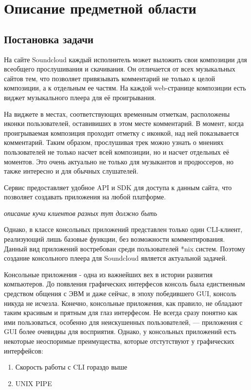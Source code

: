 \section{Описание предметной области}
\subsection{Постановка задачи}

На сайте Soundcloud каждый исполнитель
может выложить свои композиции для всеобщего прослушивания и
скачивания. Он отличается от всех музыкальных сайтов тем, что
позволяет привязывать комментарий не только к целой композиции, а к
отдельным ее частям. На каждой web-странице композиции есть виджет
музыкального плеера для её проигрывания. 

На виджете в  местах, соответствующих временным отметкам,
расположены иконки пользователей, оставивиших в этом месте
комментарий. В момент, когда проигрываемая композиция проходит отметку
с иконкой, над ней показывается комментарий. Таким образом,
прослушивая трек можно узнать о мнениях пользователей не только насчет
всей композиции, но и насчет отдельных её моментов. Это очень
актуально не только для музыкантов и продюссеров, но также интересно и
для обычных слушателей. 

Сервис предоставляет удобное API и SDK для доступа к данным сайта, что
позволяет создавать приложения на любой платформе. 

{\itshape описание кучи клиентов разных тут должно быть}

Однако, в классе консольных приложений представлен только один CLI-клиент, реализующий
лишь базовые функции, без возможности комментирования. Данный
вид приложений востребован среди пользователей *nix систем. Поэтому
создание консольного плеера для Soundcloud является актуальной
задачей. 

Консольные приложения - одна из важнейших вех в истории развития
компьютеров. До появления графических интерфесов консоль была
едиственным средством общения с ЭВМ и даже сейчас, в эпоху победившего GUI,
консоль никуда не исчезла. Конечно, консольные приложения, как
правило,  не обладают таким красивым и прятным для глаз интерфесом.
Не  всегда сразу понятно как ими пользоваться, особенно для неискушенных
пользователей, --- приложения с GUI более очевидны для восприятия. Однако, у
консольных приложений есть некоторые неоспоримые
преимущества, которые отстутствуют у графических интерфейсов:

\begin{enumerate}
\item{Скорость работы с CLI гораздо выше}
\item{UNIX PIPE}
\end{enumerate}

